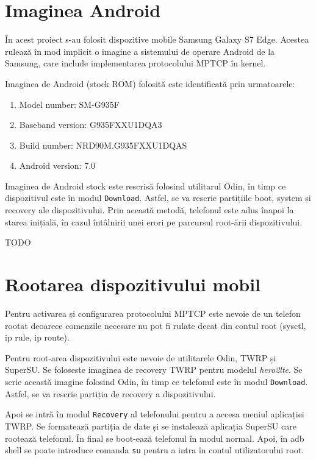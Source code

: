 \section{Imaginea Android}

În acest proiect s-au folosit dispozitive mobile Samsung Galaxy S7 Edge. Acestea rulează în mod implicit o imagine a sistemului de operare Android de la Samsung, care include implementarea protocolului MPTCP în kernel. 

Imaginea de Android (stock ROM) folosită este identificată prin urmatoarele:
\begin{enumerate}
	\item Model number: SM-G935F
	\item Baseband version: G935FXXU1DQA3
	\item Build number: NRD90M.G935FXXU1DQAS
	\item Android version: 7.0
\end{enumerate}

Imaginea de Android stock este rescrisă folosind utilitarul Odin, în timp ce dispozitivul este în modul \texttt{Download}. Astfel, se va rescrie partițiile boot, system și recovery ale dispozitivului. Prin această metodă, telefonul este adus înapoi la starea inițială, în cazul întâlnirii unei erori pe parcursul root-ării dispozitivului. 

TODO

\section{Rootarea dispozitivului mobil}

Pentru activarea și configurarea protocolului MPTCP este nevoie de un telefon rootat deoarece comenzile necesare nu pot fi rulate decat din contul root (sysctl, ip rule, ip route).

Pentru root-area dispozitivului este nevoie de utilitarele Odin, TWRP și SuperSU. Se foloseste imaginea de recovery TWRP pentru modelul \emph{hero2lte}. Se scrie această imagine folosind Odin, în timp ce telefonul este în modul \texttt{Download}. Astfel, se va rescrie partiția de recovery a dispozitivului. 

Apoi se intră în modul \texttt{Recovery} al telefonului pentru a accesa meniul aplicației TWRP. Se formatează partiția de date și se instalează aplicația SuperSU care rootează telefonul. În final se boot-ează telefonul în modul normal. Apoi, în adb shell se poate introduce comanda \texttt{su} pentru a intra în contul utilizatorului root.

